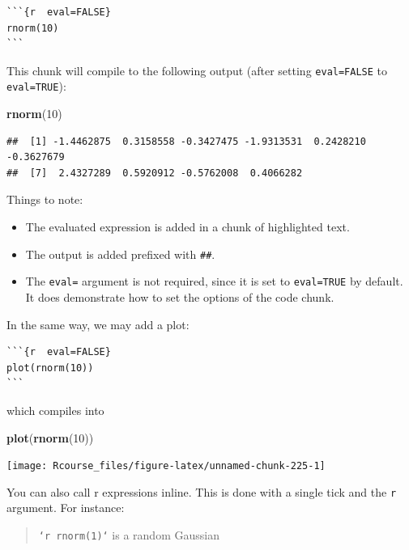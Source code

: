 \documentclass[]{book}
\newenvironment{Shaded}{\begin{snugshade}}{\end{snugshade}}
\newcommand{\KeywordTok}[1]{\textcolor[rgb]{0.13,0.29,0.53}{\textbf{{#1}}}}
\newcommand{\DecValTok}[1]{\textcolor[rgb]{0.00,0.00,0.81}{{#1}}}
\newcommand{\NormalTok}[1]{{#1}}
\providecommand{\tightlist}{%
  \setlength{\itemsep}{0pt}\setlength{\parskip}{0pt}}
\theoremstyle{definition}
\theoremstyle{definition}
\theoremstyle{remark}
\begin{document}
\begin{verbatim}
```{r  eval=FALSE}
rnorm(10)
```
\end{verbatim}

This chunk will compile to the following output (after setting
\texttt{eval=FALSE} to \texttt{eval=TRUE}):

\begin{Shaded}
\begin{Highlighting}[]
\KeywordTok{rnorm}\NormalTok{(}\DecValTok{10}\NormalTok{)}
\end{Highlighting}
\end{Shaded}

\begin{verbatim}
##  [1] -1.4462875  0.3158558 -0.3427475 -1.9313531  0.2428210 -0.3627679
##  [7]  2.4327289  0.5920912 -0.5762008  0.4066282
\end{verbatim}

Things to note:

\begin{itemize}
\tightlist
\item
  The evaluated expression is added in a chunk of highlighted text.
\item
  The output is added prefixed with \texttt{\#\#}.
\item
  The \texttt{eval=} argument is not required, since it is set to
  \texttt{eval=TRUE} by default. It does demonstrate how to set the
  options of the code chunk.
\end{itemize}

In the same way, we may add a plot:

\begin{verbatim}
```{r  eval=FALSE}
plot(rnorm(10))
```
\end{verbatim}

which compiles into

\begin{Shaded}
\begin{Highlighting}[]
\KeywordTok{plot}\NormalTok{(}\KeywordTok{rnorm}\NormalTok{(}\DecValTok{10}\NormalTok{))}
\end{Highlighting}
\end{Shaded}

\texttt{[image: Rcourse\_files/figure-latex/unnamed-chunk-225-1]}

You can also call r expressions inline. This is done with a single tick
and the \texttt{r} argument. For instance:

\begin{quote}
\texttt{`r\ rnorm(1)`} is a random Gaussian
\end{quote}
\end{document}
